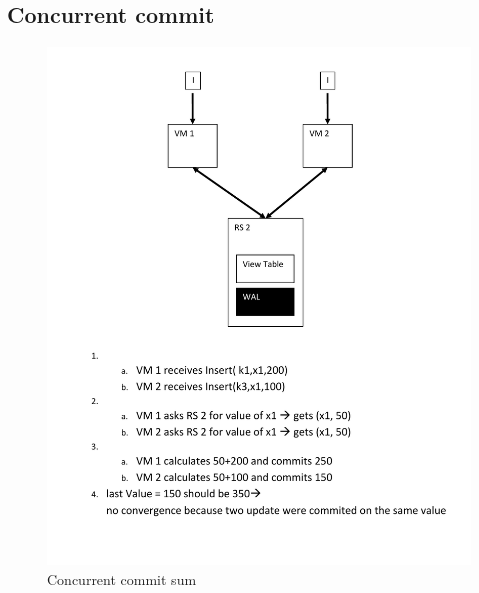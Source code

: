 \subsection{Concurrent commit}
\begin{figure}[h!]
  \centering
    \includegraphics[scale=0.8]{figures/CO_ConcurrentCommitSum}
     \caption{Concurrent commit sum}
    \label{fig:co_concurrentcommitsum}
\end{figure}
\newpage
